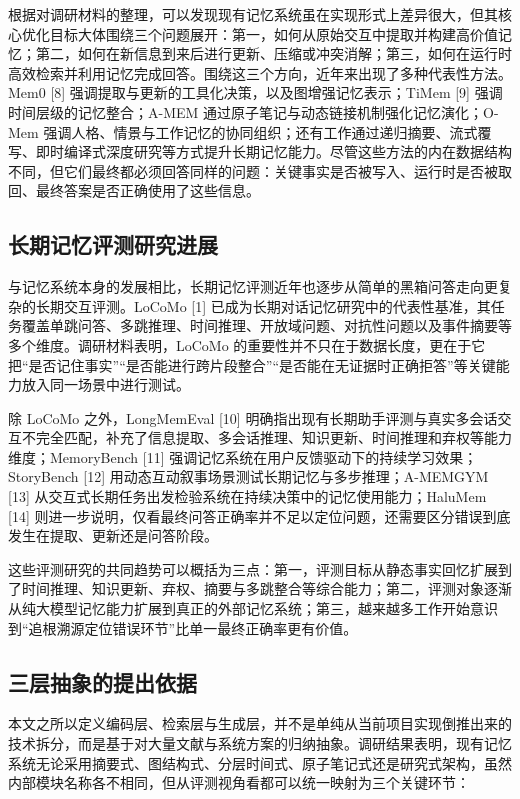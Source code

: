 根据对调研材料的整理，可以发现现有记忆系统虽在实现形式上差异很大，但其核心优化目标大体围绕三个问题展开：第一，如何从原始交互中提取并构建高价值记忆；第二，如何在新信息到来后进行更新、压缩或冲突消解；第三，如何在运行时高效检索并利用记忆完成回答。围绕这三个方向，近年来出现了多种代表性方法。Mem0 [8] 强调提取与更新的工具化决策，以及图增强记忆表示；TiMem [9] 强调时间层级的记忆整合；A-MEM 通过原子笔记与动态链接机制强化记忆演化；O-Mem 强调人格、情景与工作记忆的协同组织；还有工作通过递归摘要、流式覆写、即时编译式深度研究等方式提升长期记忆能力。尽管这些方法的内在数据结构不同，但它们最终都必须回答同样的问题：关键事实是否被写入、运行时是否被取回、最终答案是否正确使用了这些信息。

\subsection{长期记忆评测研究进展}

与记忆系统本身的发展相比，长期记忆评测近年也逐步从简单的黑箱问答走向更复杂的长期交互评测。LoCoMo [1] 已成为长期对话记忆研究中的代表性基准，其任务覆盖单跳问答、多跳推理、时间推理、开放域问题、对抗性问题以及事件摘要等多个维度。调研材料表明，LoCoMo 的重要性并不只在于数据长度，更在于它把“是否记住事实”“是否能进行跨片段整合”“是否能在无证据时正确拒答”等关键能力放入同一场景中进行测试。

除 LoCoMo 之外，LongMemEval [10] 明确指出现有长期助手评测与真实多会话交互不完全匹配，补充了信息提取、多会话推理、知识更新、时间推理和弃权等能力维度；MemoryBench [11] 强调记忆系统在用户反馈驱动下的持续学习效果；StoryBench [12] 用动态互动叙事场景测试长期记忆与多步推理；A-MEMGYM [13] 从交互式长期任务出发检验系统在持续决策中的记忆使用能力；HaluMem [14] 则进一步说明，仅看最终问答正确率并不足以定位问题，还需要区分错误到底发生在提取、更新还是问答阶段。

这些评测研究的共同趋势可以概括为三点：第一，评测目标从静态事实回忆扩展到了时间推理、知识更新、弃权、摘要与多跳整合等综合能力；第二，评测对象逐渐从纯大模型记忆能力扩展到真正的外部记忆系统；第三，越来越多工作开始意识到“追根溯源定位错误环节”比单一最终正确率更有价值。

\subsection{三层抽象的提出依据}

本文之所以定义编码层、检索层与生成层，并不是单纯从当前项目实现倒推出来的技术拆分，而是基于对大量文献与系统方案的归纳抽象。调研结果表明，现有记忆系统无论采用摘要式、图结构式、分层时间式、原子笔记式还是研究式架构，虽然内部模块名称各不相同，但从评测视角看都可以统一映射为三个关键环节：

